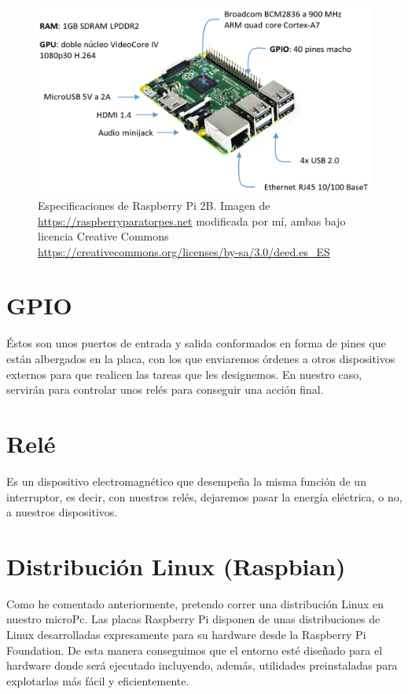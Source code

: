 \begin{figure}
    \centering
    \includegraphics[width=\textwidth]{img/RBP2B.pdf}
    \caption{Especificaciones de Raspberry Pi 2B. Imagen de \url{https://raspberryparatorpes.net} modificada por mí, ambas bajo licencia Creative Commons \url{https://creativecommons.org/licenses/by-sa/3.0/deed.es_ES} } \label{Img:Especificaciones RBP2B}
\end{figure}

\section{GPIO}
Éstos son unos puertos de entrada y salida conformados en forma de pines que están albergados en la placa, con los que enviaremos órdenes a otros dispositivos externos para que realicen las tareas que les designemos. En nuestro caso, servirán para controlar unos relés para conseguir una acción final.


\section{Relé}
Es un dispositivo electromagnético que desempeña la misma función de un interruptor, es decir, con nuestros relés, dejaremos pasar la energía eléctrica, o no, a nuestros dispositivos.

\section{Distribución Linux (Raspbian)}
Como he comentado anteriormente, pretendo correr una distribución Linux en nuestro microPc. Las placas Raspberry Pi disponen de unas distribuciones de Linux desarrolladas expresamente para su hardware desde la Raspberry Pi Foundation. De esta manera conseguimos que el entorno esté diseñado para el hardware donde será ejecutado incluyendo, además, utilidades preinstaladas para explotarlas más fácil y eficientemente.

